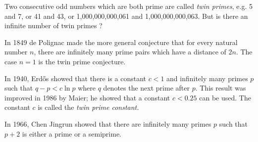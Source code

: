 \documentclass[12pt]{article}
\begin{document}
Two consecutive odd numbers which are both prime are called {\it twin primes}, e.g. 5 and 7, or 41 and 43, or 1,000,000,000,061 and 1,000,000,000,063. But is there an infinite number of twin primes ?

In 1849 de Polignac made the more general conjecture that for every natural number $n$, there are infinitely many prime pairs which have a distance of $2n$. The case $n=1$ is the twin prime conjecture.

In 1940, Erd\H{o}s showed that there is a constant $c<1$ and infinitely many primes $p$ such that $q-p<c \ln{p}$ where $q$ denotes the next prime after $p$.
This result was improved in 1986 by Maier; he showed that a constant $c < 0.25$ can be used. The constant $c$ is called the \emph{twin prime constant.}

In 1966, Chen Jingrun showed that there are infinitely many primes $p$ such that $p+2$ is either a prime or a semiprime.
\end{document}
